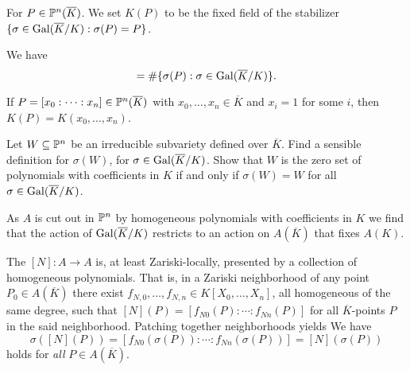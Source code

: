 \begin{definition}
  For $P\in {\mathbb{P}}^n(\overline K)$. 
  We set $K(P)$ to be the fixed field of the stabilizer
  $\{\sigma\in \mathrm{Gal}(\overline{K}/K) : \sigma(P)=P\}$. 
\end{definition}

We have
\begin{equation*}
  [K(P):K]  = \#\{\sigma(P) : \sigma\in\absgalk \}. 
\end{equation*}

If $P=[x_0:\cdots:x_n] \in {\mathbb{P}}^n(\overline K)$ with
$x_0,\ldots,x_n\in\overline K$ and $x_i=1$ for some
$i$, then $K(P) = K(x_0,\ldots,x_n)$. 

\begin{exercise}
  Let $W\subseteq{\mathbb{P}}^n$ be an irreducible subvariety defined
  over $\overline K$. Find a sensible definition for $\sigma(W)$,
  for $\sigma\in \mathrm{Gal}(\overline{K}/K)$.  Show that $W$ is the zero set of
  polynomials with coefficients in $K$ if and only if $\sigma(W)=W$
  for all $\sigma\in \mathrm{Gal}(\overline{K}/K)$.
\end{exercise}


As $A$ is cut out in ${\mathbb{P}}^n$ by homogeneous polynomials with
coefficients in $K$ we find that the action of $\mathrm{Gal}(\overline{K}/K)$ restricts to
an action on
$A(\overline K)$ that fixes $A(K)$.

The $[N]\colon A\rightarrow A$ is, at least Zariski-locally, presented
by a collection of homogeneous polynomials. That is, in a Zariski
neighborhood of any point $P_0\in A(\overline K)$ there exist
$f_{N,0},\ldots,f_{N,n}\in K[X_0,\ldots,X_n]$, all homogeneous of the
same degree, such that 
$[N](P) = [f_{N0}(P):\cdots:f_{Nn}(P)]$ for all $\overline K$-points  $P$ in the said
neighborhood.
Patching together neighborhoods yields
We have
$$\sigma([N](P)) = [f_{N0}(\sigma(P)):\cdots:f_{Nn}(\sigma(P))] =
[N](\sigma(P))$$
holds for \textit{all} $P\in A(\overline K)$.


